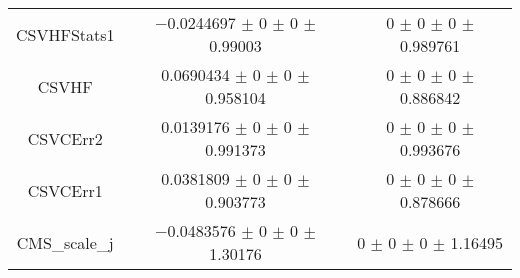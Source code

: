 \begin{table}
\begin{tabular}{ccc}
CSVHFStats1 	& \num{-0.0244697} $\pm$ \num{0} $\pm$ \num{0} $\pm$ \num{0.99003} 	& \num{0} $\pm$ \num{0} $\pm$ \num{0} $\pm$ \num{0.989761}\\
CSVHF 	& \num{0.0690434} $\pm$ \num{0} $\pm$ \num{0} $\pm$ \num{0.958104} 	& \num{0} $\pm$ \num{0} $\pm$ \num{0} $\pm$ \num{0.886842}\\
CSVCErr2 	& \num{0.0139176} $\pm$ \num{0} $\pm$ \num{0} $\pm$ \num{0.991373} 	& \num{0} $\pm$ \num{0} $\pm$ \num{0} $\pm$ \num{0.993676}\\
CSVCErr1 	& \num{0.0381809} $\pm$ \num{0} $\pm$ \num{0} $\pm$ \num{0.903773} 	& \num{0} $\pm$ \num{0} $\pm$ \num{0} $\pm$ \num{0.878666}\\
CMS\_scale\_j 	& \num{-0.0483576} $\pm$ \num{0} $\pm$ \num{0} $\pm$ \num{1.30176} 	& \num{0} $\pm$ \num{0} $\pm$ \num{0} $\pm$ \num{1.16495}\\
\bottomrule
\end{tabular}
\end{table}